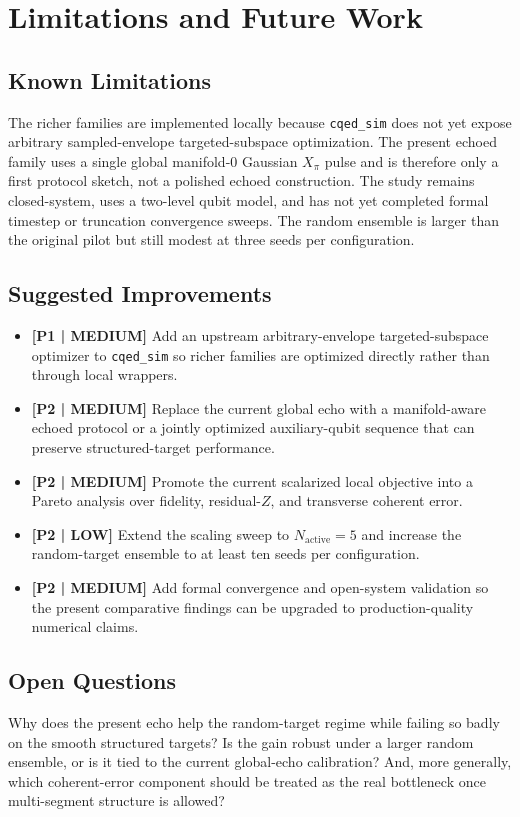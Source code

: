 \documentclass[aps,pra,twocolumn,reprint,floatfix,amsmath,amssymb]{revtex4-2}
\begin{document}
\section{Limitations and Future Work}
\subsection{Known Limitations}
The richer families are implemented locally because \texttt{cqed\_sim} does not yet expose arbitrary sampled-envelope targeted-subspace optimization. The present echoed family uses a single global manifold-0 Gaussian $X_\pi$ pulse and is therefore only a first protocol sketch, not a polished echoed construction. The study remains closed-system, uses a two-level qubit model, and has not yet completed formal timestep or truncation convergence sweeps. The random ensemble is larger than the original pilot but still modest at three seeds per configuration.

\subsection{Suggested Improvements}
\begin{itemize}
    \item \textbf{[P1 | MEDIUM]} Add an upstream arbitrary-envelope targeted-subspace optimizer to \texttt{cqed\_sim} so richer families are optimized directly rather than through local wrappers.
    \item \textbf{[P2 | MEDIUM]} Replace the current global echo with a manifold-aware echoed protocol or a jointly optimized auxiliary-qubit sequence that can preserve structured-target performance.
    \item \textbf{[P2 | MEDIUM]} Promote the current scalarized local objective into a Pareto analysis over fidelity, residual-$Z$, and transverse coherent error.
    \item \textbf{[P2 | LOW]} Extend the scaling sweep to $N_{\mathrm{active}} = 5$ and increase the random-target ensemble to at least ten seeds per configuration.
    \item \textbf{[P2 | MEDIUM]} Add formal convergence and open-system validation so the present comparative findings can be upgraded to production-quality numerical claims.
\end{itemize}

\subsection{Open Questions}
Why does the present echo help the random-target regime while failing so badly on the smooth structured targets? Is the gain robust under a larger random ensemble, or is it tied to the current global-echo calibration? And, more generally, which coherent-error component should be treated as the real bottleneck once multi-segment structure is allowed?
\end{document}
